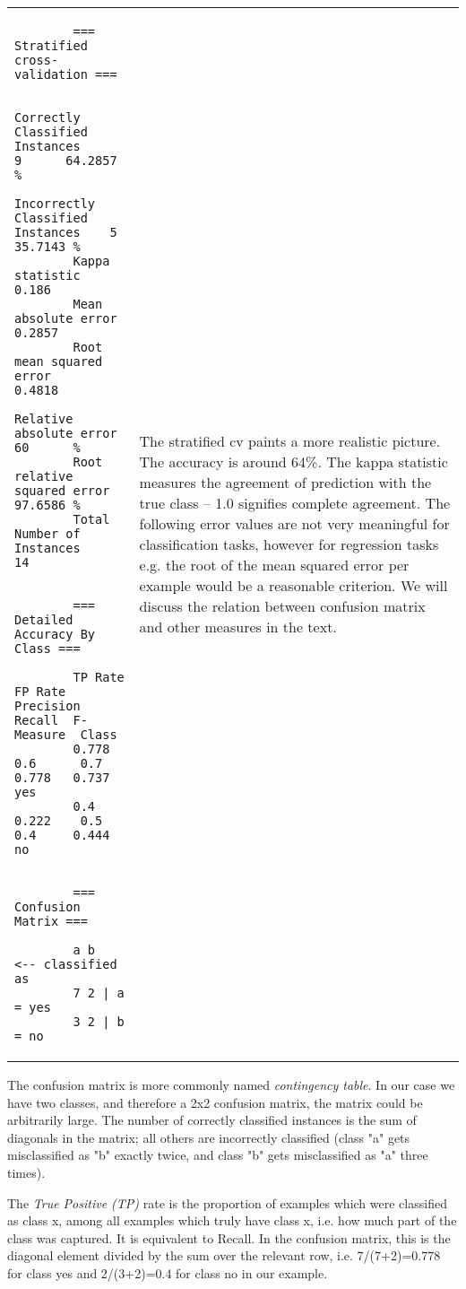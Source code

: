 \vspace{0.5cm}
\noindent
\begin{tabular}{l l}
	\begin{minipage}{7cm}
		{\scriptsize
		\begin{verbatim}
		=== Stratified cross-validation ===
		
		Correctly Classified Instances      9      64.2857 %
		Incorrectly Classified Instances    5      35.7143 %
		Kappa statistic                     0.186 
		Mean absolute error                 0.2857
		Root mean squared error             0.4818
		Relative absolute error            60      %
		Root relative squared error        97.6586 %
		Total Number of Instances          14     
		
		
		=== Detailed Accuracy By Class ===
		
		TP Rate  FP Rate  Precision  Recall  F-Measure  Class
		0.778    0.6      0.7        0.778   0.737      yes
		0.4      0.222    0.5        0.4     0.444      no
		
		
		=== Confusion Matrix ===
		
		a b   <-- classified as
		7 2 | a = yes
		3 2 | b = no
		\end{verbatim}}
	\end{minipage}
	&
	\begin{minipage}{5cm}
	The stratified cv paints a more realistic picture. The accuracy is around 64\%. The kappa statistic measures the agreement of prediction with the true class -- 1.0 signifies complete agreement. The following error values are not very meaningful for classification tasks, however for regression tasks e.g. the root of the mean squared error per example would be a reasonable criterion. We will discuss the relation between confusion matrix and other measures in the text.
	\end{minipage}
	\\
\end{tabular}

\vspace{0.5cm}

The confusion matrix is more commonly named \textit{contingency table}. In our case we have two classes, and therefore a 2x2 confusion matrix, the matrix could be arbitrarily large. The number of correctly classified instances is the sum of diagonals in the matrix; all others are incorrectly classified (class "a" gets misclassified as "b" exactly twice, and class "b" gets misclassified as "a" three times).

The \textit{True Positive (TP)} rate is the proportion of examples which were classified as class x, among all examples which truly have class x, i.e. how much part of the class was captured. It is equivalent to Recall. In the confusion matrix, this is the diagonal element divided by the sum over the relevant row, i.e. 7/(7+2)=0.778 for class yes and 2/(3+2)=0.4 for class no in our example.

